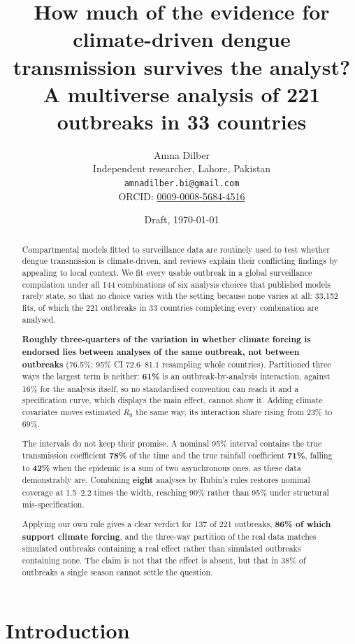 \documentclass[11pt,a4paper]{article}
\title{\bfseries How much of the evidence for climate-driven dengue\\
transmission survives the analyst?\\
\large A multiverse analysis of 221 outbreaks in 33 countries}
\author{Amna Dilber\\
\small Independent researcher, Lahore, Pakistan\\
\small \texttt{amnadilber.bi@gmail.com}\\
\small ORCID: \href{https://orcid.org/0009-0008-5684-4516}{0009-0008-5684-4516}}
\date{Draft, \today}
\begin{document}
\maketitle

\begin{abstract}
\noindent
Compartmental models fitted to surveillance data are routinely used to test
whether dengue transmission is climate-driven, and reviews explain their
conflicting findings by appealing to local context. We fit every usable outbreak
in a global surveillance compilation under all 144 combinations of six analysis
choices that published models rarely state, so that no choice varies with the
setting because none varies at all: 33{,}152 fits, of which the 221 outbreaks in
33 countries completing every combination are analysed.

\textbf{Roughly three-quarters of the variation in whether climate forcing is
endorsed lies between analyses of the same outbreak, not between outbreaks}
(76.5\%; 95\% CI 72.6--81.1 resampling whole countries). Partitioned three ways
the largest term is neither: \textbf{61\%} is an outbreak-by-analysis
interaction, against 16\% for the analysis itself, so no standardised convention
can reach it and a specification curve, which displays the main effect, cannot
show it. Adding climate covariates moves estimated $R_0$ the same way, its
interaction share rising from 23\% to 69\%.

The intervals do not keep their promise. A nominal 95\% interval contains the
true transmission coefficient \textbf{78\%} of the time and the true rainfall
coefficient \textbf{71\%}, falling to \textbf{42\%} when the epidemic is a
sum of two
asynchronous ones, as these data demonstrably are. Combining \textbf{eight}
analyses by Rubin's rules restores nominal coverage at 1.5--2.2 times the width,
reaching 90\% rather than 95\% under structural mis-specification.

Applying our own rule gives a clear verdict for 137 of 221 outbreaks,
\textbf{86\% of which support climate forcing}, and the three-way partition of
the real data matches simulated outbreaks containing a real effect rather than
simulated outbreaks containing none. The claim is not that the effect is absent,
but that in 38\% of outbreaks a single season cannot settle the question.
\end{abstract}

\section{Introduction}
\end{document}
